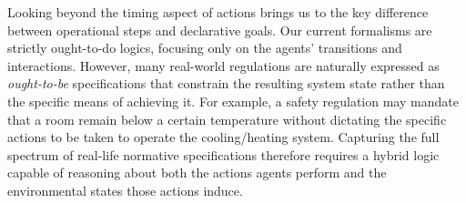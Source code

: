 Looking beyond the timing aspect of actions brings us to the key difference between operational steps and declarative goals. Our current formalisms are strictly ought-to-do logics, focusing only on the agents' transitions and interactions. However, many real-world regulations are naturally expressed as \emph{ought-to-be} specifications that constrain the resulting system state rather than the specific means of achieving it. For example, a safety regulation may mandate that a room remain below a certain temperature without dictating the specific actions to be taken to operate the cooling/heating system. Capturing the full spectrum of real-life normative specifications therefore requires a hybrid logic capable of reasoning about both the actions agents perform and the environmental states those actions induce.